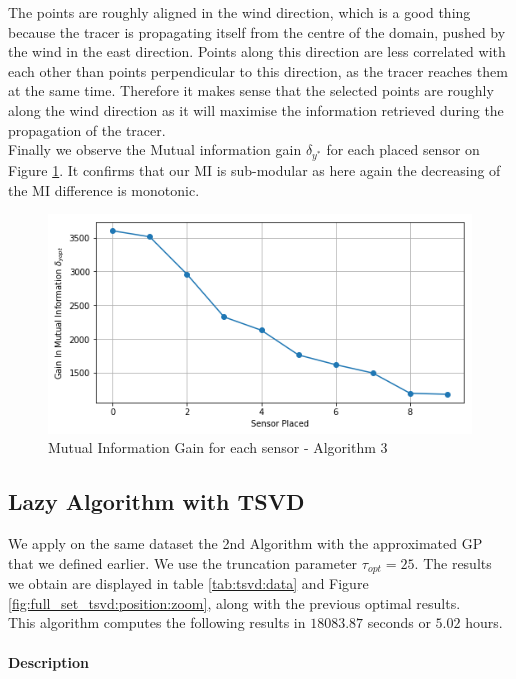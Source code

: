 The points are roughly aligned in the wind direction, which is a good thing because the tracer is propagating itself from the centre of the domain, pushed by the wind in the east direction. Points along this direction are less correlated with each other than points perpendicular to this direction, as the tracer reaches them at the same time. Therefore it makes sense that the selected points are roughly along the wind direction as it will maximise the information retrieved during the propagation of the tracer. \\

Finally we observe the Mutual information gain $\delta_{y^*}$ for each placed sensor on Figure \ref{fig:full_set_Alg3:MIGAIN}. It confirms that our MI is sub-modular as here again the decreasing of the MI difference is monotonic. 
 \\


\begin{figure}[h]
\centering
\includegraphics[width=0.6\linewidth]{figures/MainOptimResults/alg3opteps10-6_DeltaY}
\caption{Mutual Information Gain for each sensor - Algorithm 3}
\label{fig:full_set_Alg3:MIGAIN}
\end{figure}




\subsection{Lazy Algorithm with TSVD} \label{sec:res:TSVD}

We apply on the same dataset the 2nd Algorithm with the approximated GP that we defined earlier. We use the truncation parameter $\tau_{opt} = 25$. The results we obtain are displayed in table \ref{tab:tsvd:data} and Figure \ref{fig:full_set_tsvd:position:zoom}, along with the previous optimal results. \\ 
 
This algorithm computes the following results in $18083.87$ seconds or $5.02$ hours. 
 
 \paragraph{Description}


